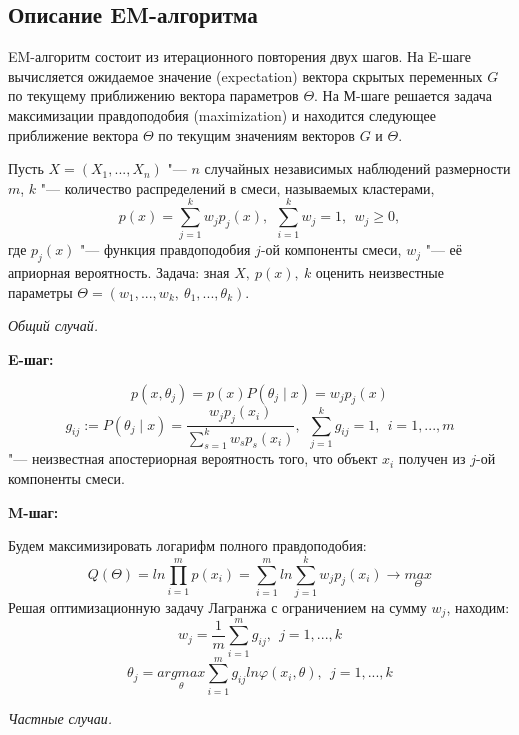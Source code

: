 \subsection{Описание EM-алгоритма}
    EM-алгоритм состоит из итерационного повторения двух шагов. На E-шаге вычисляется ожидаемое значение (expectation) вектора скрытых переменных $G$ по текущему приближению вектора параметров $\Theta$. На М-шаге решается задача максимизации правдоподобия (maximization) и находится следующее приближение вектора $\Theta$ по текущим значениям векторов $G$ и $\Theta$.

    Пусть $X = (X_1, ..., X_n)$ "--- $n$ случайных независимых наблюдений размерности $m$, $k$ "--- количество распределений в смеси, называемых кластерами,
    $$p(x) = \sum_{j=1}^k w_j p_j(x), \ \ \sum_{i=1}^k w_j = 1, \ \ w_j \geq 0,$$ где $p_j(x)$ "--- функция правдоподобия $j$-ой компоненты смеси, $w_j$ "--- её априорная вероятность. Задача: зная $X,\ p(x),\ k$ оценить неизвестные параметры $\Theta = (w_1, ..., w_k,\ \theta_1, ..., \theta_k)$.

    \emph{Общий случай.}

    \textbf{E-шаг:}

    $$p(x, \theta_j) = p(x)P(\theta_j \mid x) = w_jp_j(x)$$
    $$g_{ij} := P(\theta_j \mid x) = \frac{w_jp_j(x_i)}{\sum_{s=1}^k w_s p_s(x_i)}, \ \ \sum_{j=1}^k g_{ij} = 1, \ \ i = 1, ..., m$$ "--- неизвестная апостериорная вероятность того, что объект $x_i$ получен из $j$-ой компоненты смеси.


    \textbf{M-шаг:}

    Будем максимизировать логарифм полного правдоподобия:
    $$Q(\Theta) = ln\prod_{i=1}^m p(x_i) = \sum_{i=1}^m ln \sum_{j=1}^k w_jp_j(x_i) \to \underset{\Theta}{max}$$
    Решая оптимизационную задачу Лагранжа с ограничением на сумму $w_j$, находим:
    $$w_j = \frac{1}{m} \sum_{i=1}^m g_{ij}, \ \ j = 1, ..., k$$
    $$\theta_j = \underset{\theta}{argmax} \sum_{i=1}^mg_{ij}ln\varphi(x_i, \theta), \ \ j =1, ..., k$$

    \emph{Частные случаи.}

